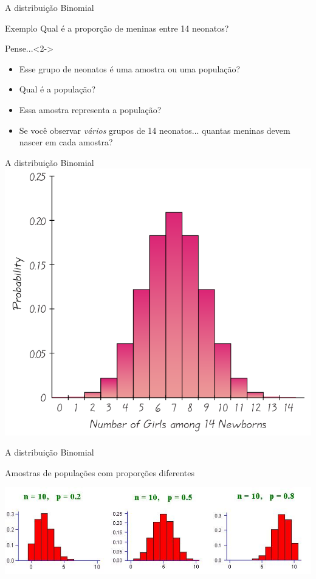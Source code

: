\documentclass{beamer}
\begin{document}
\begin{frame}{A distribuição Binomial}
  \begin{exampleblock}{Exemplo}
    \footnotesize
    Qual é a proporção de meninas entre 14 neonatos?
  \end{exampleblock}
  \begin{block}{Pense...}<2->
    \begin{itemize}
    \footnotesize
    \item Esse grupo de neonatos é uma amostra ou uma população?
    \item<3-> Qual é a população?
    \item<4-> Essa amostra \alert{representa} a população?
      \bigskip
    \item<5-> Se você observar {\em vários} grupos de 14 neonatos... quantas meninas devem nascer em cada amostra?
    \end{itemize}
  \end{block}

\end{frame}

\begin{frame}{A distribuição Binomial}
  \includegraphics[height=\textheight]{Cap2/discreta}
\end{frame}


\begin{frame}{A distribuição Binomial}
  \begin{block}{}
    Amostras de populações com proporções diferentes
  \end{block}

  \includegraphics[width=\textwidth]{Cap2/binomial}
\end{frame}
\end{document}
